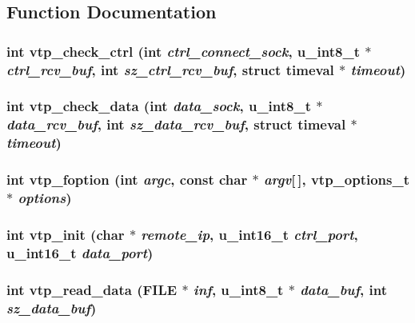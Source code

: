 \subsection{Function Documentation}
\subsubsection{\setlength{\rightskip}{0pt plus 5cm}int vtp\_\-check\_\-ctrl (int {\em ctrl\_\-connect\_\-sock}, u\_\-int8\_\-t $\ast$ {\em ctrl\_\-rcv\_\-buf}, int {\em sz\_\-ctrl\_\-rcv\_\-buf}, struct timeval $\ast$ {\em timeout})}\label{vtp_8h_a18}


\subsubsection{\setlength{\rightskip}{0pt plus 5cm}int vtp\_\-check\_\-data (int {\em data\_\-sock}, u\_\-int8\_\-t $\ast$ {\em data\_\-rcv\_\-buf}, int {\em sz\_\-data\_\-rcv\_\-buf}, struct timeval $\ast$ {\em timeout})}\label{vtp_8h_a20}


\subsubsection{\setlength{\rightskip}{0pt plus 5cm}int vtp\_\-foption (int {\em argc}, const char $\ast$ {\em argv}[$\,$], {\bf vtp\_\-options\_\-t} $\ast$ {\em options})}\label{vtp_8h_a15}


\subsubsection{\setlength{\rightskip}{0pt plus 5cm}int vtp\_\-init (char $\ast$ {\em remote\_\-ip}, u\_\-int16\_\-t {\em ctrl\_\-port}, u\_\-int16\_\-t {\em data\_\-port})}\label{vtp_8h_a17}


\subsubsection{\setlength{\rightskip}{0pt plus 5cm}int vtp\_\-read\_\-data (FILE $\ast$ {\em inf}, u\_\-int8\_\-t $\ast$ {\em data\_\-buf}, int {\em sz\_\-data\_\-buf})}\label{vtp_8h_a22}


